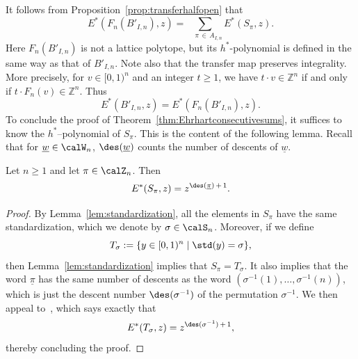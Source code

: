It follows from Proposition~\ref{prop:transferhalfopen} that
\[
E^*(F_n(B'_{I,n}),z)=\!\!\!\!\sum_{\quad\pi\,\in\,A_{I,n}} E^*(S_\pi,z).
\]
Here $F_n(B'_{I,n})$ is not a lattice polytope, but its $h^*$-polynomial is defined in the same way as that of $B'_{I,n}$. Note also that the transfer map preserves integrality. More precisely, for $v \in [0,1)^n$ and an integer $t\geq1$, we have $ t\cdot v \in \mathbb{Z}^n$ if and only if $ t\cdot F_n(v) \in \mathbb{Z}^n$. Thus
\[
E^*(B'_{I,n},z)=E^*(F_n(B'_{I,n}),z).
\]
To conclude the proof of Theorem~\ref{thm:Ehrhartconsecutivesums}, it suffices to know the $h^*$--polynomial of $S_\pi$. This is the content of the following lemma. Recall that for $\underline{w} \in \calW_n$, $\des(\underline{w})$ counts the number of descents of $\underline{w}$.

\begin{lemm}\label{lem:HJV}
Let $n\geq 1$ and let $\pi\in\calZ_n$. Then
\begin{equation}
E^*(S_\pi, z) = z^{\des(\underline{\pi})\,+\,1}.
\end{equation}
\end{lemm}


\begin{proof}
By Lemma~\ref{lem:standardization}, all the elements in $S_\pi$ have the same standardization, which we denote by $\sigma\in\calS_n$. Moreover, if we define
\[
T_\sigma:=\{ y\in[0,1)^n \mid \std(y)=\sigma \},
\]
then Lemma~\ref{lem:standardization} implies that $S_\pi=T_\sigma$. It also implies that the word $\underline{\pi}$ has the same number of descents as the word $(\sigma^{-1}(1),\ldots,\sigma^{-1}(n))$, which is just the descent number $\des(\sigma^{-1})$ of the permutation $\sigma^{-1}$. We then appeal to~\cite[Lemma~4]{HJV16}, which says exactly that
\[
E^*(T_{\sigma}, z) = z^{\des(\sigma^{-1})\,+\,1},
\]
thereby concluding the proof.
\end{proof}
